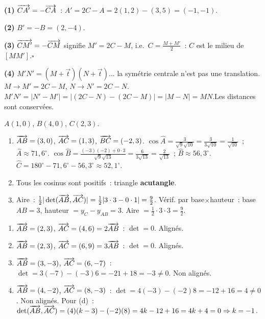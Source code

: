 
\textbf{(1)} $\overrightarrow{CA'}=-\overrightarrow{CA}$~: $A'=2C-A=2(1,2)-(3,5)=(-1,-1)$.

\textbf{(2)} $B'=-B=(2,-4)$.

\textbf{(3)} $\overrightarrow{CM'}=-\overrightarrow{CM}$ signifie $M'=2C-M$, i.e.\ $C=\frac{M+M'}{2}$~:
$C$ est le milieu de $[MM']$.\hfill$\square$

\textbf{(4)} $M'N'=(M+\vec{t})(N+\vec{t})$... la sym\'etrie centrale n'est pas une translation.
$M\to M'=2C-M$, $N\to N'=2C-N$.
$M'N'=|N'-M'|=|(2C-N)-(2C-M)|=|M-N|=MN$.\checkmark\quad Les distances sont conserv\'ees.


$A(1,0)$, $B(4,0)$, $C(2,3)$.
\begin{enumerate}
  \item $\overrightarrow{AB}=(3,0)$, $\overrightarrow{AC}=(1,3)$, $\overrightarrow{BC}=(-2,3)$.
        $\cos\hat{A}=\frac{3}{\sqrt{9}\sqrt{10}}=\frac{3}{3\sqrt{10}}=\frac{1}{\sqrt{10}}$~;
        $\hat{A}\approx71{,}6^{\circ}$.
        $\cos\hat{B}=\frac{(-3)(-2)+0\cdot3}{\sqrt{9}\sqrt{13}}=\frac{6}{3\sqrt{13}}=\frac{2}{\sqrt{13}}$~;
        $\hat{B}\approx56{,}3^{\circ}$.
        $\hat{C}=180^{\circ}-71{,}6^{\circ}-56{,}3^{\circ}\approx52{,}1^{\circ}$.
  \item Tous les cosinus sont positifs~: triangle \textbf{acutangle}.
  \item Aire~: $\frac{1}{2}|\det(\overrightarrow{AB},\overrightarrow{AC})|=\frac{1}{2}|3\cdot3-0\cdot1|=\frac{9}{2}$.
        V\'erif. par base$\times$hauteur~: base $AB=3$, hauteur $= y_C-y_{AB}=3$. Aire $=\frac{1}{2}\cdot3\cdot3=\frac{9}{2}$.\checkmark
\end{enumerate}


\begin{enumerate}
  \item $\overrightarrow{AB}=(2,3)$, $\overrightarrow{AC}=(4,6)=2\overrightarrow{AB}$~: $\det=0$. Align\'es.
  \item $\overrightarrow{AB}=(2,3)$, $\overrightarrow{AC}=(6,9)=3\overrightarrow{AB}$~: $\det=0$. Align\'es.
  \item $\overrightarrow{AB}=(3,-3)$, $\overrightarrow{AC}=(6,-7)$~: $\det=3(-7)-(-3)6=-21+18=-3\ne0$. Non align\'es.
  \item $\overrightarrow{AB}=(4,-2)$, $\overrightarrow{AC}=(8,-3)$~: $\det=4(-3)-(-2)8=-12+16=4\ne0$. Non align\'es.
        Pour (d)~: $\det(\overrightarrow{AB},\overrightarrow{AC})=(4)(k-3)-(-2)(8)=4k-12+16=4k+4=0\Rightarrow k=-1$.
\end{enumerate}

